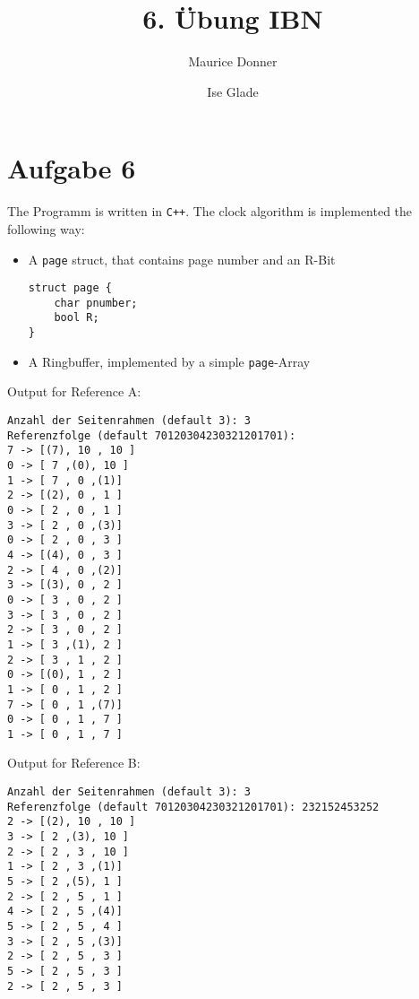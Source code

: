 \documentclass{article}
\title{\textsf{\color{blue!40!black}6. Übung IBN}}
\author{Maurice Donner \and Ise Glade}
\begin{document}
\section{Aufgabe 6}
The Programm is written in \texttt{C++}. The clock algorithm
is implemented the following way:\\
\begin{itemize}
    \item A \texttt{page} struct, that contains page number and an R-Bit
\begin{lstlisting}
struct page {
    char pnumber;
    bool R;
}
\end{lstlisting}
    \item A Ringbuffer, implemented by a simple \texttt{page}-Array

\end{itemize}
Output for Reference A:

\begin{lstlisting}
Anzahl der Seitenrahmen (default 3): 3
Referenzfolge (default 70120304230321201701): 
7 -> [(7), 10 , 10 ]
0 -> [ 7 ,(0), 10 ]
1 -> [ 7 , 0 ,(1)]
2 -> [(2), 0 , 1 ]
0 -> [ 2 , 0 , 1 ]
3 -> [ 2 , 0 ,(3)]
0 -> [ 2 , 0 , 3 ]
4 -> [(4), 0 , 3 ]
2 -> [ 4 , 0 ,(2)]
3 -> [(3), 0 , 2 ]
0 -> [ 3 , 0 , 2 ]
3 -> [ 3 , 0 , 2 ]
2 -> [ 3 , 0 , 2 ]
1 -> [ 3 ,(1), 2 ]
2 -> [ 3 , 1 , 2 ]
0 -> [(0), 1 , 2 ]
1 -> [ 0 , 1 , 2 ]
7 -> [ 0 , 1 ,(7)]
0 -> [ 0 , 1 , 7 ]
1 -> [ 0 , 1 , 7 ]
\end{lstlisting}

Output for Reference B:
\begin{lstlisting}
Anzahl der Seitenrahmen (default 3): 3
Referenzfolge (default 70120304230321201701): 232152453252
2 -> [(2), 10 , 10 ]
3 -> [ 2 ,(3), 10 ]
2 -> [ 2 , 3 , 10 ]
1 -> [ 2 , 3 ,(1)]
5 -> [ 2 ,(5), 1 ]
2 -> [ 2 , 5 , 1 ]
4 -> [ 2 , 5 ,(4)]
5 -> [ 2 , 5 , 4 ]
3 -> [ 2 , 5 ,(3)]
2 -> [ 2 , 5 , 3 ]
5 -> [ 2 , 5 , 3 ]
2 -> [ 2 , 5 , 3 ]
\end{lstlisting}
\end{document}
